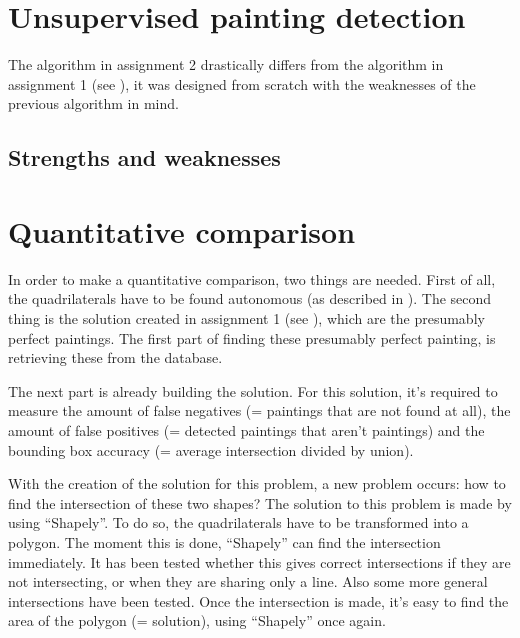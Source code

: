 \section{Unsupervised painting detection}
\label{sec:unsupervised_painting_detection}
The algorithm in assignment 2 drastically differs from the algorithm in assignment 1 (see ), it was designed from scratch with the weaknesses of the previous algorithm in mind.



\subsection{Strengths and weaknesses}



\section{Quantitative comparison}
In order to make a quantitative comparison, two things are needed. First of all, the quadrilaterals have to be found autonomous (as described in ). The second thing is the solution created in assignment 1 (see ), which are the presumably perfect paintings. The first part of finding these presumably perfect painting, is retrieving these from the database.

The next part is already building the solution. For this solution, it's required to measure the amount of false negatives (= paintings that are not found at all), the amount of false positives (= detected paintings that aren't paintings) and the bounding box accuracy (= average intersection divided by union).

With the creation of the solution for this problem, a new problem occurs: how to find the intersection of these two shapes? The solution to this problem is made by using ``Shapely''. To do so, the quadrilaterals have to be transformed into a polygon. The moment this is done, ``Shapely'' can find the intersection immediately. It has been tested whether this gives correct intersections if they are not intersecting, or when they are sharing only a line. Also some more general intersections have been tested. Once the intersection is made, it's easy to find the area of the polygon (= solution), using ``Shapely'' once again.

